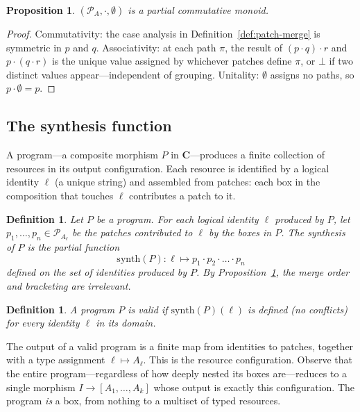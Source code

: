 \documentclass[11pt]{article}
\newtheorem{proposition}[theorem]{Proposition}
\newtheorem{definition}[theorem]{Definition}
\newcommand{\cat}[1]{\mathbf{#1}}
\newcommand{\Patch}{\mathcal{P}}
\begin{document}
    \begin{proposition}\label{prop:pcm}
        $(\Patch_A, \cdot, \emptyset)$ is a partial commutative monoid.
    \end{proposition}

    \begin{proof}
        Commutativity: the case analysis in Definition~\ref{def:patch-merge} is symmetric
        in $p$ and $q$. Associativity: at each path $\pi$, the result of $(p \cdot q)
        \cdot r$ and $p \cdot (q \cdot r)$ is the unique value assigned by whichever
        patches define $\pi$, or $\bot$ if two distinct values appear---independent of
        grouping. Unitality: $\emptyset$ assigns no paths, so $p \cdot \emptyset = p$.
    \end{proof}

    \subsection{The synthesis function}

    A program---a composite morphism $P$ in $\cat{C}$---produces a finite collection of
    resources in its output configuration. Each resource is identified by a logical
    identity $\ell$ (a unique string) and assembled from patches: each box in the
    composition that touches $\ell$ contributes a patch to it.

    \begin{definition}
        Let $P$ be a program. For each logical identity $\ell$ produced by $P$, let
        $p_1, \ldots, p_n \in \Patch_{A_\ell}$ be the patches contributed to $\ell$ by
        the boxes in $P$. The \emph{synthesis} of $P$ is the partial function
        \[
            \mathrm{synth}(P) \colon \ell \mapsto p_1 \cdot p_2 \cdot \ldots \cdot p_n
        \]
        defined on the set of identities produced by $P$. By Proposition~\ref{prop:pcm},
        the merge order and bracketing are irrelevant.
    \end{definition}

    \begin{definition}
        A program $P$ is \emph{valid} if $\mathrm{synth}(P)(\ell)$ is defined (no
        conflicts) for every identity $\ell$ in its domain.
    \end{definition}

    The output of a valid program is a finite map from identities to patches, together
    with a type assignment $\ell \mapsto A_\ell$. This is the resource configuration.
    Observe that the entire program---regardless of how deeply nested its boxes
    are---reduces to a single morphism $I \to [A_1, \ldots, A_k]$ whose output is exactly
    this configuration. The program \emph{is} a box, from nothing to a multiset of typed
    resources.
\end{document}

